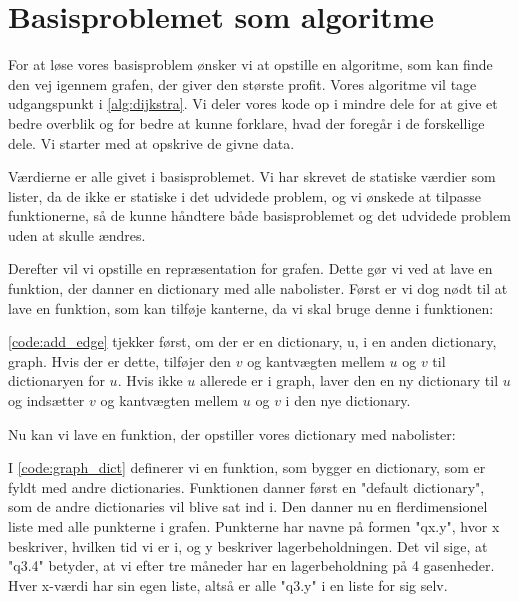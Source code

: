 \section{Basisproblemet som algoritme}
For at løse vores basisproblem ønsker vi at opstille en algoritme, som kan finde den vej igennem grafen, der giver den største profit. Vores algoritme vil tage udgangspunkt i \autoref{alg:dijkstra}. Vi deler vores kode op i mindre dele for at give et bedre overblik og for bedre at kunne forklare, hvad der foregår i de forskellige dele. Vi starter med at opskrive de givne data. 



Værdierne er alle givet i basisproblemet. Vi har skrevet de statiske værdier som lister, da de ikke er statiske i det udvidede problem, og vi ønskede at tilpasse funktionerne, så de kunne håndtere både basisproblemet og det udvidede problem uden at skulle ændres. 

Derefter vil vi opstille en repræsentation for grafen. Dette gør vi ved at lave en funktion, der danner en dictionary med alle nabolister. Først er vi dog nødt til at lave en funktion, som kan tilføje kanterne, da vi skal bruge denne i funktionen:



\autoref{code:add_edge} tjekker først, om der er en dictionary, u, i en anden dictionary, graph. Hvis der er dette, tilføjer den $v$ og kantvægten mellem $u$ og $v$ til dictionaryen for $u$. Hvis ikke $u$ allerede er i graph, laver den en ny dictionary til $u$ og indsætter $v$ og kantvægten mellem $u$ og $v$ i den nye dictionary.

Nu kan vi lave en funktion, der opstiller vores dictionary med nabolister:



I \autoref{code:graph_dict} definerer vi en funktion, som bygger en dictionary, som er fyldt med andre dictionaries. Funktionen danner først en "default dictionary", som de andre dictionaries vil blive sat ind i.
Den danner nu en flerdimensionel liste med alle punkterne i grafen. Punkterne har navne på formen "qx.y", hvor x beskriver, hvilken tid vi er i, og y beskriver lagerbeholdningen. Det vil sige, at "q3.4" betyder, at vi efter tre måneder har en lagerbeholdning på 4 gasenheder. Hver x-værdi har sin egen liste, altså er alle "q3.y" i en liste for sig selv.

